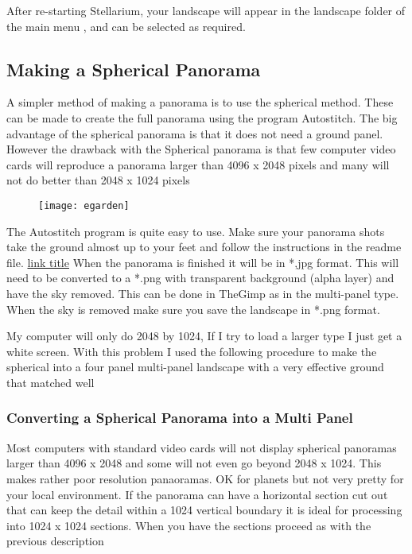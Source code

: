 After re-starting Stellarium, your landscape will appear in the
landscape folder of the main menu , and can be selected as required.

\subsection{Making a Spherical
Panorama}\label{making-a-spherical-panorama}

A simpler method of making a panorama is to use the spherical method.
These can be made to create the full panorama using the program
Autostitch. The big advantage of the spherical panorama is that it does
not need a ground panel. However the drawback with the Spherical
panorama is that few computer video cards will reproduce a panorama
larger than 4096 x 2048 pixels and many will not do better than 2048 x
1024 pixels

\begin{figure}[h]
\centering\texttt{[image: egarden]}
\end{figure}

The Autostitch program is quite easy to use. Make sure your panorama
shots take the ground almost up to your feet and follow the instructions
in the readme file. \href{http://www.example.com}{link title} When the
panorama is finished it will be in *,jpg format. This will need to be
converted to a *.png with transparent background (alpha layer) and have
the sky removed. This can be done in TheGimp as in the multi-panel type.
When the sky is removed make sure you save the landscape in *.png
format.

My computer will only do 2048 by 1024, If I try to load a larger type I
just get a white screen. With this problem I used the following
procedure to make the spherical into a four panel multi-panel landscape
with a very effective ground that matched well

\subsubsection{Converting a Spherical Panorama into a Multi
Panel}\label{converting-a-spherical-panorama-into-a-multi-panel}

Most computers with standard video cards will not display spherical
panoramas larger than 4096 x 2048 and some will not even go beyond 2048
x 1024. This makes rather poor resolution panaoramas. OK for planets but
not very pretty for your local environment. If the panorama can have a
horizontal section cut out that can keep the detail within a 1024
vertical boundary it is ideal for processing into 1024 x 1024 sections.
When you have the sections proceed as with the previous description

